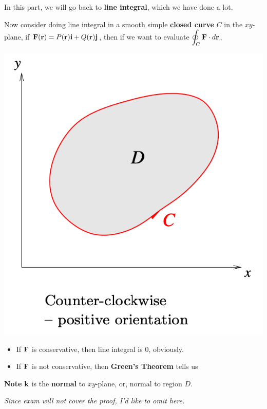 \documentclass[11pt, a4paper]{MATH2023}
\newcommand{\ii}{{\bf i}}
\newcommand{\jj}{{\bf j}}
\newcommand{\kk}{{\bf k}}
\newcommand{\rr}{{\bf r}}
\newcommand{\FF}{{\bf F}}
\begin{document}
\begin{spacing}{1.3}
    {\blue In this part, we will go back to {\bf line integral}, which we have done a lot.}

    Now consider doing line integral in a smooth simple {\bf closed curve} $C$ in the $xy$-plane,
    if $\FF(\rr)=P(\rr)\ii+Q(\rr)\jj$, then if we want to evaluate $\disp \oint_C\FF\cdot d\rr$,
    \begin{center}
        \includegraphics[scale=0.43]{images/Ch16-green-closed-path.png}
    \end{center}
    \begin{itemize}
        \item If $\FF$ is conservative, then line integral is 0, obviously.
        \item If $\FF$ is not conservative, then {\bf Green's Theorem} tells us 
        \begin{center}
            \boxed{$$\disp \oint_C \FF\cdot d\rr=\iint_D (\nabla \times \FF)\cdot \kk\ dA$$}
        \end{center}
    \end{itemize}
    {\bf Note} $\kk$ is the {\bf normal} to $xy$-plane, or, normal to region $D$.

    \vspace{0.3in}
    {\it Since exam will not cover the proof, I'd like to omit here.}


\end{spacing}
\end{document}
